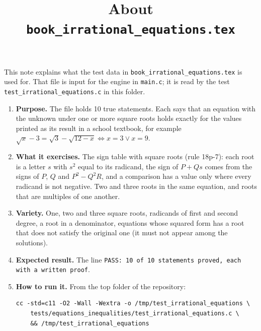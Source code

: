 \documentclass[11pt,a4paper]{article}
\title{About \texttt{book\_irrational\_equations.tex}}
\author{}
\date{}
\begin{document}
\maketitle
This note explains what the test data in \texttt{book\_irrational\_equations.tex} is used for. That file is input for the engine in \texttt{main.c}; it is read by the test \texttt{test\_irrational\_equations.c} in this folder.

\begin{enumerate}
\item \textbf{Purpose.} The file holds 10 true statements. Each says that an equation with the unknown under one or more square roots holds exactly for the values printed as its result in a school textbook, for example $\sqrt{x} - 3 = \sqrt{3} - \sqrt{12 - x} \iff x = 3 \lor x = 9$.

\item \textbf{What it exercises.} The sign table with square roots (rule 18p-7): each root is a letter $s$ with $s^{2}$ equal to its radicand, the sign of $P + Qs$ comes from the signs of $P$, $Q$ and $P^{2} - Q^{2}R$, and a comparison has a value only where every radicand is not negative. Two and three roots in the same equation, and roots that are multiples of one another.

\item \textbf{Variety.} One, two and three square roots, radicands of first and second degree, a root in a denominator, equations whose squared form has a root that does not satisfy the original one (it must not appear among the solutions).

\item \textbf{Expected result.} The line \texttt{PASS: 10 of 10 statements proved, each with a written proof}.

\item \textbf{How to run it.} From the top folder of the repository:
\begin{verbatim}
cc -std=c11 -O2 -Wall -Wextra -o /tmp/test_irrational_equations \
    tests/equations_inequalities/test_irrational_equations.c \
    && /tmp/test_irrational_equations
\end{verbatim}
\end{enumerate}
\end{document}
